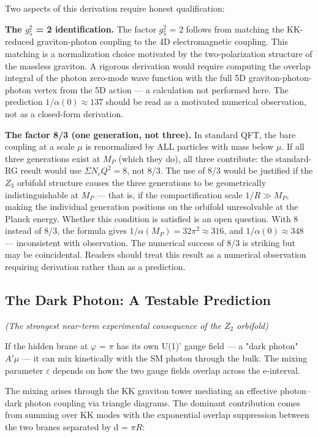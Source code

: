 \documentclass[aps,prd,preprint,superscriptaddress,longbibliography,floatfix]{revtex4-2}
\theoremstyle{remark}
\begin{document}
Two aspects of this derivation require honest qualification:

\textbf{The $g_{5}^{2}$ = 2 identification.} The factor $g_{5}^{2}$ = 2 follows from matching the KK-reduced graviton-photon coupling to the 4D electromagnetic coupling. This matching is a normalization choice motivated by the two-polarization structure of the massless graviton. A rigorous derivation would require computing the overlap integral of the photon zero-mode wave function with the full 5D graviton-photon-photon vertex from the 5D action --- a calculation not performed here. The prediction $1/\alpha(0) \approx 137$ should be read as a motivated numerical observation, not as a closed-form derivation.

\textbf{The factor 8/3 (one generation, not three).} In standard QFT, the bare coupling at a scale $\mu$ is renormalized by ALL particles with mass below $\mu$. If all three generations exist at $M_P$ (which they do), all three contribute: the standard-RG result would use $\Sigma N_c Q^{2} = 8$, not 8/3. The use of 8/3 would be justified if the $Z_{3}$ orbifold structure causes the three generations to be geometrically indistinguishable at $M_P$ --- that is, if the compactification scale $1/R \gg M_P$, making the individual generation positions on the orbifold unresolvable at the Planck energy. Whether this condition is satisfied is an open question. With 8 instead of 8/3, the formula gives $1/\alpha(M_P) = 32\pi^{2} \approx 316$, and $1/\alpha(0) \approx 348$ --- inconsistent with observation. The numerical success of 8/3 is striking but may be coincidental. Readers should treat this result as a numerical observation requiring derivation rather than as a prediction.



\subsection{The Dark Photon: A Testable Prediction}

\textit{(The strongest near-term experimental consequence of the $Z_{2}$ orbifold)}

If the hidden brane at $\varphi$ = $\pi$ has its own U(1)' gauge field --- a "dark photon" $A'\mu$ --- it can mix kinetically with the SM photon through the bulk. The mixing parameter $\varepsilon$ depends on how the two gauge fields overlap across the e-interval.

The mixing arises through the KK graviton tower mediating an effective photon--dark photon coupling via triangle diagrams. The dominant contribution comes from summing over KK modes with the exponential overlap suppression between the two branes separated by d = $\pi R$:
\end{document}
